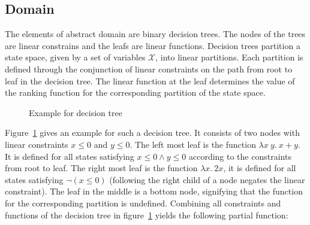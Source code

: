 \documentclass[11pt,a4paper,titlepage]{article}
\begin{document}
\subsection{Domain}

The elements of abstract domain are binary decision trees. The nodes of the trees are linear constrains and the leafs are linear functions.
Decision trees partition a state space, given by a set of variables $\mathcal{X}$, into linear partitions. 
Each partition is defined through the conjunction of linear constraints on the path from root to leaf in the decision tree.
The linear function at the leaf determines the value of the ranking function for the corresponding partition of the state space.\\

\begin{figure}
    \centering
    \caption{Example for decision tree}
    \label{fig:decision_tree_example}
\end{figure}

Figure~\ref{fig:decision_tree_example} gives an example for such a decision tree. 
It consists of two nodes with linear constraints $x \leq 0$ and $y \leq 0$. The left most leaf is the function $\lambda x \ y. \ x + y$. 
It is defined for all states satisfying $x \leq 0 \land y \leq 0$ according to the constraints from root to leaf. 
The right most leaf is the function $\lambda x.\ 2x$, it is defined for all states satisfying $\neg (x \leq 0)$ 
(following the right child of a node negates the linear constraint). The leaf in the middle is a bottom node, 
signifying that the function for the corresponding partition is undefined. Combining all constraints and functions of
the decision tree in figure~\ref{fig:decision_tree_example} yields the following partial function:
\end{document}
